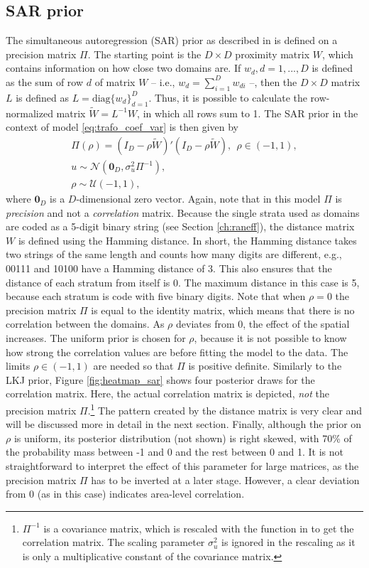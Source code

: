 \subsection{SAR prior}
The simultaneous autoregression (SAR) prior as described in \cite{chung_bayesian_2020} is defined on a precision matrix $\Pi$.
The starting point is the $D\times D$ proximity matrix $W$, which contains information on how close two domains are.
If $w_d, d = 1, ..., D$ is defined as the sum of row $d$ of matrix $W$ – i.e., $w_d = \displaystyle \sum_{i = 1}^D w_{di}$ –, then the $D \times D$ matrix $L$ is defined as $L = \text{diag}\{w_d\}_{d=1}^D$.
Thus, it is possible to calculate the row-normalized matrix $\widetilde W = L^{-1}W$, in which all rows sum to 1.
The SAR prior in the context of model \ref{eq:trafo_coef_var} is then given by
\begin{gather*}
    \Pi(\rho) = (I_D - \rho \widetilde W)'(I_D - \rho \widetilde W), ~~ \rho \in (-1, 1),\\
    u \sim \mathcal N(\boldsymbol{0}_D, \sigma_u^2 \Pi^{-1}),\\
    \rho \sim \mathcal U(-1, 1),
\end{gather*}
where $\boldsymbol{0}_D$ is a $D$-dimensional zero vector.
Again, note that in this model $\Pi$ is \textit{precision} and not a \textit{correlation} matrix.
Because the single strata used as domains are coded as a 5-digit binary string (see Section \ref{ch:raneff}), the distance matrix $W$ is defined using the Hamming distance.
In short, the Hamming distance takes two strings of the same length and counts how many digits are different, e.g., 00111 and 10100 have a Hamming distance of 3.
This also ensures that the distance of each stratum from itself is 0.
The maximum distance in this case is 5, because each stratum is code with five binary digits.
Note that when $\rho = 0$ the precision matrix $\Pi$ is equal to the identity matrix, which means that there is no correlation between the domains.
As $\rho$ deviates from 0, the effect of the spatial increases.
The uniform prior is chosen for $\rho$, because it is not possible to know how strong the correlation values are before fitting the model to the data.
The limits $\rho \in (-1, 1)$ are needed so that $\Pi$ is positive definite.
Similarly to the LKJ prior, Figure \ref{fig:heatmap_sar} shows four posterior draws for the correlation matrix.
Here, the actual correlation matrix is depicted, \textit{not} the precision matrix $\Pi$.\footnote{$\Pi^{-1}$ is a covariance matrix, which is rescaled with the  function in  to get the correlation matrix. The scaling parameter $\sigma^2_u$ is ignored in the rescaling as it is only a multiplicative constant of the covariance matrix.}
The pattern created by the distance matrix is very clear and will be discussed more in detail in the next section.
Finally, although the prior on $\rho$ is uniform, its posterior distribution (not shown) is right skewed, with 70\% of the probability mass between -1 and 0 and the rest between 0 and 1.
It is not straightforward to interpret the effect of this parameter for large matrices, as the precision matrix $\Pi$ has to be inverted at a later stage.
However, a clear deviation from 0 (as in this case) indicates area-level correlation.


